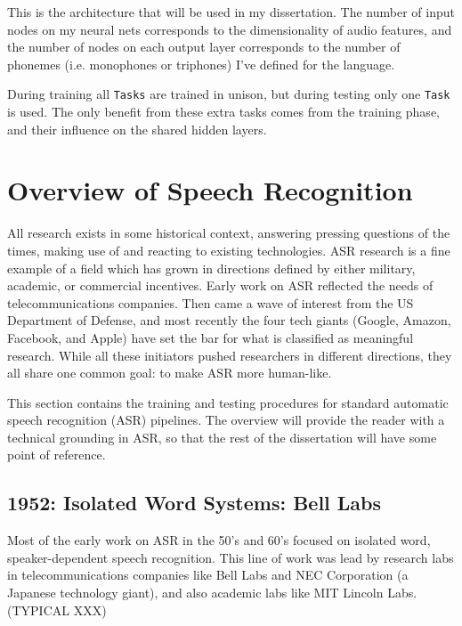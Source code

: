 \documentclass[10pt,a4paper]{article}
\begin{document}
This is the architecture that will be used in my dissertation. The number of input nodes on my neural nets corresponds to the dimensionality of audio features, and the number of nodes on each output layer corresponds to the number of phonemes (i.e. monophones or triphones) I've defined for the language.

During training all \texttt{Tasks} are trained in unison, but during testing only one \texttt{Task} is used. The only benefit from these extra tasks comes from the training phase, and their influence on the shared hidden layers.




















\newpage

\section{Overview of Speech Recognition}

All research exists in some historical context, answering pressing questions of the times, making use of and reacting to existing technologies. ASR research is a fine example of a field which has grown in directions defined by either military, academic, or commercial incentives. Early work on ASR reflected the needs of telecommunications companies. Then came a wave of interest from the US Department of Defense, and most recently the four tech giants (Google, Amazon, Facebook, and Apple) have set the bar for what is classified as meaningful research. While all these initiators pushed researchers in different directions, they all share one common goal: to make ASR more human-like.

This section contains the training and testing procedures for standard automatic speech recognition (ASR) pipelines. The overview will provide the reader with a technical grounding in ASR, so that the rest of the dissertation will have some point of reference. 

\subsection{1952: Isolated Word Systems: Bell Labs}
Most of the early work on ASR in the 50's and 60's focused on isolated word, speaker-dependent speech recognition. This line of work was lead by research labs in telecommunications companies like Bell Labs and NEC Corporation (a Japanese technology giant), and also academic labs like MIT Lincoln Labs. (TYPICAL XXX)
\end{document}
